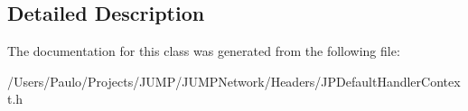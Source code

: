 \subsection{Detailed Description}
 

The documentation for this class was generated from the following file:\begin{DoxyCompactItemize}
\item 
/Users/Paulo/Projects/JUMP/JUMPNetwork/Headers/JPDefaultHandlerContext.h\end{DoxyCompactItemize}
